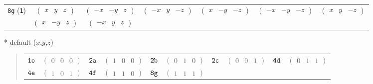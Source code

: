 \documentclass[fleqn,9pt,landscape]{jsarticle}
\begin{document}
\begin{center}
\begin{longtable}{ccccccc}
{\tt 8g} ({\tt 1}) & $ \begin{pmatrix} x & y & z \end{pmatrix} $ & $ \begin{pmatrix} - x & - y & z \end{pmatrix} $ & $ \begin{pmatrix} - x & y & - z \end{pmatrix} $ & $ \begin{pmatrix} x & - y & - z \end{pmatrix} $ & $ \begin{pmatrix} - x & - y & - z \end{pmatrix} $ & $ \begin{pmatrix} x & y & - z \end{pmatrix} $ \\
& $ \begin{pmatrix} x & - y & z \end{pmatrix} $ & $ \begin{pmatrix} - x & y & z \end{pmatrix} $ & $  $ & $  $ & $  $ & $  $ \\
\end{longtable}
\end{center}
* default ($x$,$y$,$z$)
\begin{quote}
\begin{tabular}{cccccccccc}
$ {\tt 1o} $ & $ \begin{pmatrix} 0 & 0 & 0 \end{pmatrix} $ & $ {\tt 2a} $ & $ \begin{pmatrix} 1 & 0 & 0 \end{pmatrix} $ & $ {\tt 2b} $ & $ \begin{pmatrix} 0 & 1 & 0 \end{pmatrix} $ & $ {\tt 2c} $ & $ \begin{pmatrix} 0 & 0 & 1 \end{pmatrix} $ & $ {\tt 4d} $ & $ \begin{pmatrix} 0 & 1 & 1 \end{pmatrix} $ \\
$ {\tt 4e} $ & $ \begin{pmatrix} 1 & 0 & 1 \end{pmatrix} $ & $ {\tt 4f} $ & $ \begin{pmatrix} 1 & 1 & 0 \end{pmatrix} $ & $ {\tt 8g} $ & $ \begin{pmatrix} 1 & 1 & 1 \end{pmatrix} $ & $  $ & $  $ & $  $ & $  $
\end{tabular}
\end{quote}
\end{document}
